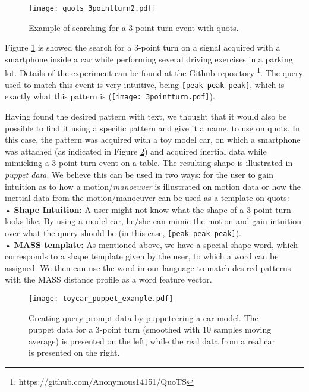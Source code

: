 \begin{figure}
\texttt{[image: quots\_3pointturn2.pdf]}
\caption{Example of searching for a 3 point turn event with \gls{quots}.}
\label{fig:quots_3pointturn}
\end{figure}

Figure \ref{fig:quots_3pointturn} is showed the search for a 3-point turn on a signal acquired with a smartphone inside a car while performing several driving exercises in a parking lot. Details of the experiment can be found at the Github repository \footnote{https://github.com/Anonymous14151/QuoTS}. The query used to match this event is very intuitive, being \texttt{[peak peak peak]}, which is exactly what this pattern is (\texttt{[image: 3pointturn.pdf]}). 
\par
Having found the desired pattern with text, we thought that it would also be possible to find it using a specific pattern and give it a name, to use on \gls{quots}. In this case, the pattern was acquired with a toy model car, on which a smartphone was attached (as indicated in Figure \ref{fig:puppeteering}) and acquired inertial data while mimicking a 3-point turn event on a table. The resulting shape is illustrated in \textit{puppet data}. We believe this can be used in two ways: for the user to gain intuition as to how a motion/\textit{manoeuver} is illustrated on motion data or how the inertial data from the motion/manoeuver can be used as a template on \gls{quots}: \\
•	\textbf{Shape Intuition:} A user might not know what the shape of a 3-point turn looks like. By using a model car, he/she can mimic the motion and gain intuition over what the query should be (in this case, \texttt{[peak peak peak]}). \\
•	\textbf{MASS template:} As mentioned above, we have a special shape word, which corresponds to a shape template given by the user, to which a word can be assigned. We then can use the word in our language to match desired patterns with the MASS distance profile as a word feature vector.  

\begin{figure}[h]
    \centering
    \texttt{[image: toycar\_puppet\_example.pdf]}
    \caption{Creating query prompt data by puppeteering a car model. The puppet data for a 3-point turn (smoothed with 10 samples moving average) is presented on the left, while the real data from a real car is presented on the right. }
    \label{fig:puppeteering}
\end{figure}

